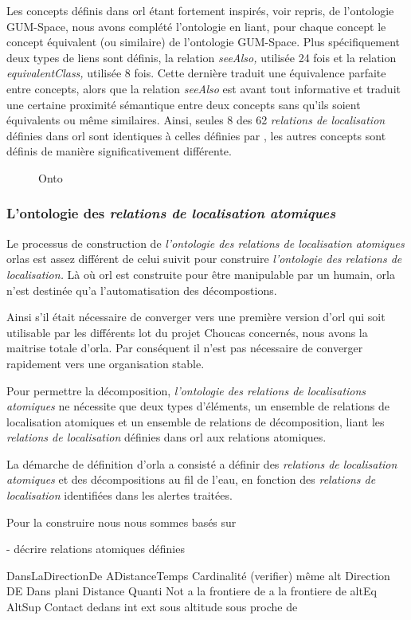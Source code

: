 Les concepts définis dans \ac{orl} étant fortement inspirés, voir
repris, de l'ontologie GUM-Space, nous avons complété l'ontologie en
liant, pour chaque concept le concept équivalent (ou similaire) de
l'ontologie GUM-Space. Plus spécifiquement deux types de liens sont
définis, la relation \emph{seeAlso,} utilisée 24 fois et la relation
\emph{equivalentClass,} utilisée 8 fois. Cette dernière traduit une
équivalence parfaite entre concepts, alors que la relation
\emph{seeAlso} est avant tout informative et traduit une certaine
proximité sémantique entre deux concepts sans qu'ils soient
équivalents ou même similaires. Ainsi, seules 8 des 62 \emph{relations
  de localisation} définies dans \ac{orl} sont identiques à celles
définies par \textcite{Bateman2010}, les autres concepts sont définis
de manière significativement différente.

\begin{figure}
  \centering
  
  \caption{Onto}
  \label{fig:ontho}
\end{figure}

\subsubsection{L'ontologie des \emph{relations de localisation
    atomiques}}

Le processus de construction de \emph{l'ontologie des relations de
  localisation atomiques} \acp{orla} est assez différent de celui
suivit pour construire \emph{l'ontologie des relations de
  localisation.} Là où \ac{orl} est construite pour être manipulable
par un humain, \ac{orla} n'est destinée qu'a l'automatisation des
décompostions.

Ainsi s'il était nécessaire de converger vers une première version
d'\ac{orl} qui soit utilisable par les différents lot du projet
Choucas concernés, nous avons la maitrise totale d'\ac{orla}. Par
conséquent il n'est pas nécessaire de converger rapidement vers une
organisation stable.

Pour permettre la décomposition, \emph{l'ontologie des relations de
  localisations atomiques} ne nécessite que deux types d'éléments, un
ensemble de relations de localisation atomiques et un ensemble de
relations de décomposition, liant les \emph{relations de localisation}
définies dans \ac{orl} aux relations atomiques.

La démarche de définition d'\ac{orla} a consisté a définir des
\emph{relations de localisation atomiques} et des décompositions au
fil de l'eau, en fonction des \emph{relations de localisation}
identifiées dans les alertes traitées.


Pour la construire nous nous sommes basés sur

- décrire relations atomiques définies

DansLaDirectionDe
ADistanceTemps
Cardinalité (verifier)
même alt
Direction DE
Dans plani
Distance Quanti
Not a la frontiere de
a la frontiere de
altEq
AltSup
Contact
dedans
int
ext
sous altitude
sous proche de 

